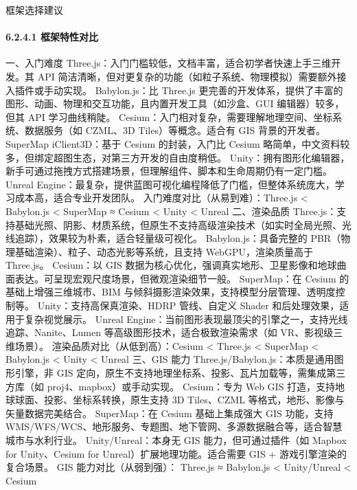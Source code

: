 {{框架选择建议}\label{ux6846ux67b6ux9009ux62e9ux5efaux8bae} \paragraph{6.2.4.1
框架特性对比}\label{ux6846ux67b6ux7279ux6027ux5bf9ux6bd4} 一、入门难度 Three.js：入门门槛较低，文档丰富，适合初学者快速上手三维开发。其 API
简洁清晰，但对更复杂的功能（如粒子系统、物理模拟）需要额外接入插件或手动实现。 Babylon.js：比 Three.js 更完善的开发体系，提供了丰富的图形、动画、物理和交互功能，且内置开发工具（如沙盒、GUI 编辑器）较多，但其 API
学习曲线稍陡。 Cesium：入门相对复杂，需要理解地理空间、坐标系统、数据服务（如 CZML、3D Tiles）等概念。适合有 GIS 背景的开发者。 SuperMap iClient3D：基于 Cesium 的封装，入门比 Cesium
略简单，中文资料较多，但绑定超图生态，对第三方开发的自由度稍低。 Unity：拥有图形化编辑器，新手可通过拖拽方式搭建场景，但理解组件、脚本和生命周期仍有一定门槛。 Unreal
Engine：最复杂，提供蓝图可视化编程降低了门槛，但整体系统庞大，学习成本高，适合专业开发团队。 入门难度对比（从易到难）：Three.js \textless{} Babylon.js \textless{} SuperMap ≈
Cesium \textless{} Unity \textless{} Unreal 二、渲染品质 Three.js：支持基础光照、阴影、材质系统，但原生不支持高级渲染技术（如实时全局光照、光线追踪），效果较为朴素，适合轻量级可视化。
Babylon.js：具备完整的 PBR（物理基础渲染）、粒子、动态光影等系统，且支持 WebGPU，渲染质量高于 Three.js。 Cesium：以 GIS
数据为核心优化，强调真实地形、卫星影像和地球曲面表达。可呈现宏观尺度场景，但微观渲染细节一般。 SuperMap：在 Cesium 的基础上增强三维城市、BIM 与倾斜摄影渲染效果，支持模型分层管理、透明度控制等。
Unity：支持高保真渲染、HDRP 管线、自定义 Shader 和后处理效果，适用于复杂视觉展示。 Unreal Engine：当前图形表现最顶尖的引擎之一，支持光线追踪、Nanite、Lumen 等高级图形技术，适合极致渲染需求（如
VR、影视级三维场景）。 渲染品质对比（从低到高）：Cesium \textless{} Three.js \textless{} SuperMap \textless{} Babylon.js \textless{} Unity
\textless{} Unreal 三、GIS 能力 Three.js/Babylon.js：本质是通用图形引擎，非 GIS 定向，原生不支持地理坐标系、投影、瓦片加载等，需集成第三方库（如 proj4、mapbox）或手动实现。
Cesium：专为 Web GIS 打造，支持地球球面、投影、坐标系转换，原生支持 3D Tiles、CZML 等格式，地形、影像与矢量数据完美结合。 SuperMap：在 Cesium 基础上集成强大 GIS 功能，支持
WMS/WFS/WCS、地形服务、专题图、地下管网、多源数据融合等，适合智慧城市与水利行业。 Unity/Unreal：本身无 GIS 能力，但可通过插件（如 Mapbox for Unity、Cesium for
Unreal）扩展地理功能。适合需要 GIS + 游戏引擎渲染的复合场景。 GIS 能力对比（从弱到强）： Three.js ≈ Babylon.js \textless{} Unity/Unreal \textless{} Cesium
}
